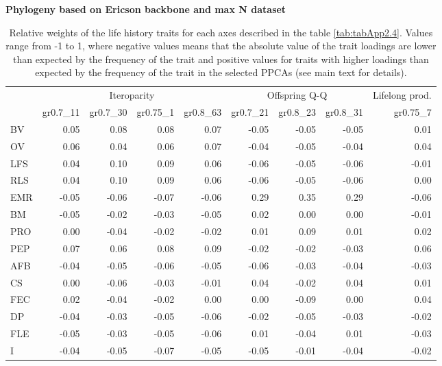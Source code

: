 \clearpage%
\begin{landscape}
\begin{table}
\center
\caption[LHT relative importance of the alternative axes]{
Relative weights of the life history traits for each axes described in the
table \ref{tab:tabApp2.4}. Values range from -1 to 1, where negative values
means that the absolute value of the trait loadings are lower than expected by
the frequency of the trait and positive values for traits with higher loadings
than expected by the frequency of the trait in the selected PPCAs (see main
text for details).
}
\label{tab:tabApp2.6}
\begin{footnotesize}

\textbf{Phylogeny based on Ericson backbone and max N dataset}

\begin{tabular}{@{}l|rrrr|rrr|r@{}}
\toprule
 & \multicolumn{4}{c|}{Iteroparity} & \multicolumn{3}{c|}{Offspring Q-Q} & \multicolumn{1}{c}{Lifelong prod.}\\
 & gr0.7\_11 & gr0.7\_30 & gr0.75\_1 & gr0.8\_63 & gr0.7\_21 & gr0.8\_23 & gr0.8\_31 & gr0.75\_7\\
\midrule
BV & 0.05 & 0.08 & 0.08 & 0.07 & -0.05 & -0.05 & -0.05 & 0.01\\
OV & 0.06 & 0.04 & 0.06 & 0.07 & -0.04 & -0.05 & -0.04 & 0.04\\
LFS & 0.04 & 0.10 & 0.09 & 0.06 & -0.06 & -0.05 & -0.06 & -0.01\\
RLS & 0.04 & 0.10 & 0.09 & 0.06 & -0.06 & -0.05 & -0.06 & 0.00\\
EMR & -0.05 & -0.06 & -0.07 & -0.06 & 0.29 & 0.35 & 0.29 & -0.06\\
BM & -0.05 & -0.02 & -0.03 & -0.05 & 0.02 & 0.00 & 0.00 & -0.01\\
PRO & 0.00 & -0.04 & -0.02 & -0.02 & 0.01 & 0.09 & 0.01 & 0.02\\
PEP & 0.07 & 0.06 & 0.08 & 0.09 & -0.02 & -0.02 & -0.03 & 0.06\\
AFB & -0.04 & -0.05 & -0.06 & -0.05 & -0.06 & -0.03 & -0.04 & -0.03\\
CS & 0.00 & -0.06 & -0.03 & -0.01 & 0.04 & -0.02 & 0.04 & 0.01\\
FEC & 0.02 & -0.04 & -0.02 & 0.00 & 0.00 & -0.09 & 0.00 & 0.04\\
DP & -0.04 & -0.03 & -0.05 & -0.06 & -0.02 & -0.05 & -0.03 & -0.02\\
FLE & -0.05 & -0.03 & -0.05 & -0.06 & 0.01 & -0.04 & 0.01 & -0.03\\
I & -0.04 & -0.05 & -0.07 & -0.05 & -0.05 & -0.01 & -0.04 & -0.02\\
\bottomrule
\end{tabular}


\end{footnotesize}
\end{table}
\end{landscape}
